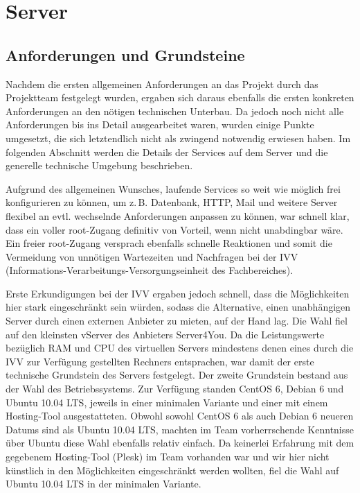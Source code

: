 \section{Server}
\subsection{Anforderungen und Grundsteine}
Nachdem die ersten allgemeinen Anforderungen an das Projekt durch das Projektteam festgelegt wurden, ergaben sich daraus ebenfalls die ersten konkreten Anforderungen an den nötigen technischen Unterbau. Da jedoch noch nicht alle Anforderungen bis ins Detail ausgearbeitet waren, wurden einige Punkte umgesetzt, die sich letztendlich nicht als zwingend notwendig erwiesen haben. Im folgenden Abschnitt werden die Details der Services auf dem Server und die generelle technische Umgebung beschrieben.

Aufgrund des allgemeinen Wunsches, laufende Services so weit wie möglich frei konfigurieren zu können, um z.\,B. Datenbank, HTTP, Mail und weitere Server flexibel an evtl. wechselnde Anforderungen anpassen zu können, war schnell klar, dass ein voller root-Zugang definitiv von Vorteil, wenn nicht unabdingbar wäre. Ein freier root-Zugang versprach ebenfalls schnelle Reaktionen und somit die Vermeidung von unnötigen Wartezeiten und Nachfragen bei der IVV (Informations-Verarbeitungs-Versorgungseinheit des Fachbereiches).

Erste Erkundigungen bei der IVV ergaben jedoch schnell, dass die Möglichkeiten hier stark eingeschränkt sein würden, sodass die Alternative, einen unabhängigen Server durch einen externen Anbieter zu mieten, auf der Hand lag. Die Wahl fiel auf den kleinsten vServer des Anbieters Server4You. Da die Leistungswerte bezüglich RAM und CPU des virtuellen Servers mindestens denen eines durch die IVV zur Verfügung gestellten Rechners entsprachen, war damit der erste technische Grundstein des Servers festgelegt.
Der zweite Grundstein bestand aus der Wahl des Betriebssystems. Zur Verfügung standen CentOS 6, Debian 6 und Ubuntu 10.04 LTS, jeweils in einer minimalen Variante und einer mit einem Hosting-Tool ausgestatteten.
Obwohl sowohl CentOS 6 als auch Debian 6 neueren Datums sind als Ubuntu 10.04 LTS, machten im Team vorherrschende Kenntnisse über Ubuntu diese Wahl ebenfalls relativ einfach. Da keinerlei Erfahrung mit dem gegebenem Hosting-Tool (Plesk) im Team vorhanden war und wir hier nicht künstlich in den Möglichkeiten eingeschränkt werden wollten, fiel die Wahl auf Ubuntu 10.04 LTS in der minimalen Variante.

